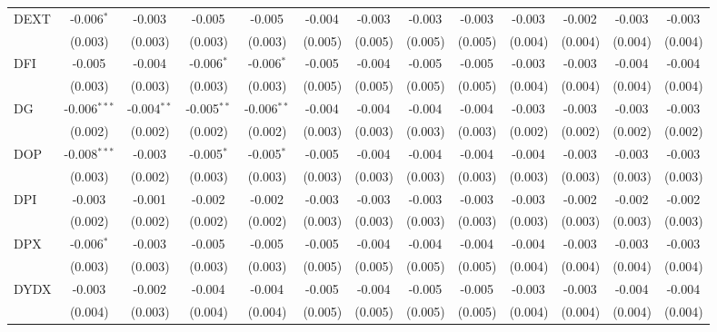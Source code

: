 \begin{table}[!htbp]
\begin{tabular}{@{\extracolsep{5pt}}lcccccccccccc}
 DEXT & -0.006$^{*}$ & -0.003$^{}$ & -0.005$^{}$ & -0.005$^{}$ & -0.004$^{}$ & -0.003$^{}$ & -0.003$^{}$ & -0.003$^{}$ & -0.003$^{}$ & -0.002$^{}$ & -0.003$^{}$ & -0.003$^{}$ \\
  & (0.003) & (0.003) & (0.003) & (0.003) & (0.005) & (0.005) & (0.005) & (0.005) & (0.004) & (0.004) & (0.004) & (0.004) \\
 DFI & -0.005$^{}$ & -0.004$^{}$ & -0.006$^{*}$ & -0.006$^{*}$ & -0.005$^{}$ & -0.004$^{}$ & -0.005$^{}$ & -0.005$^{}$ & -0.003$^{}$ & -0.003$^{}$ & -0.004$^{}$ & -0.004$^{}$ \\
  & (0.003) & (0.003) & (0.003) & (0.003) & (0.005) & (0.005) & (0.005) & (0.005) & (0.004) & (0.004) & (0.004) & (0.004) \\
 DG & -0.006$^{***}$ & -0.004$^{**}$ & -0.005$^{**}$ & -0.006$^{**}$ & -0.004$^{}$ & -0.004$^{}$ & -0.004$^{}$ & -0.004$^{}$ & -0.003$^{}$ & -0.003$^{}$ & -0.003$^{}$ & -0.003$^{}$ \\
  & (0.002) & (0.002) & (0.002) & (0.002) & (0.003) & (0.003) & (0.003) & (0.003) & (0.002) & (0.002) & (0.002) & (0.002) \\
 DOP & -0.008$^{***}$ & -0.003$^{}$ & -0.005$^{*}$ & -0.005$^{*}$ & -0.005$^{}$ & -0.004$^{}$ & -0.004$^{}$ & -0.004$^{}$ & -0.004$^{}$ & -0.003$^{}$ & -0.003$^{}$ & -0.003$^{}$ \\
  & (0.003) & (0.002) & (0.003) & (0.003) & (0.003) & (0.003) & (0.003) & (0.003) & (0.003) & (0.003) & (0.003) & (0.003) \\
 DPI & -0.003$^{}$ & -0.001$^{}$ & -0.002$^{}$ & -0.002$^{}$ & -0.003$^{}$ & -0.003$^{}$ & -0.003$^{}$ & -0.003$^{}$ & -0.003$^{}$ & -0.002$^{}$ & -0.002$^{}$ & -0.002$^{}$ \\
  & (0.002) & (0.002) & (0.002) & (0.002) & (0.003) & (0.003) & (0.003) & (0.003) & (0.003) & (0.003) & (0.003) & (0.003) \\
 DPX & -0.006$^{*}$ & -0.003$^{}$ & -0.005$^{}$ & -0.005$^{}$ & -0.005$^{}$ & -0.004$^{}$ & -0.004$^{}$ & -0.004$^{}$ & -0.004$^{}$ & -0.003$^{}$ & -0.003$^{}$ & -0.003$^{}$ \\
  & (0.003) & (0.003) & (0.003) & (0.003) & (0.005) & (0.005) & (0.005) & (0.005) & (0.004) & (0.004) & (0.004) & (0.004) \\
 DYDX & -0.003$^{}$ & -0.002$^{}$ & -0.004$^{}$ & -0.004$^{}$ & -0.005$^{}$ & -0.004$^{}$ & -0.005$^{}$ & -0.005$^{}$ & -0.003$^{}$ & -0.003$^{}$ & -0.004$^{}$ & -0.004$^{}$ \\
  & (0.004) & (0.003) & (0.004) & (0.004) & (0.005) & (0.005) & (0.005) & (0.005) & (0.004) & (0.004) & (0.004) & (0.004) \\

\end{tabular}
\end{table}
